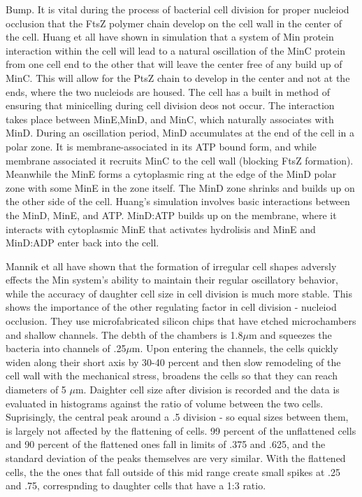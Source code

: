 \documentclass[pdftex,10pt,a4paper]{article}
\begin{document}


Bump.
It is vital during the process of bacterial cell division for proper nucleiod occlusion that the FtsZ polymer chain develop on the cell wall in the center of the cell.  Huang et all have shown in simulation that a system of Min protein interaction within the cell will lead to a natural oscillation of the MinC protein from one cell end to the other that will leave the center free of any build up of MinC.  This will allow for the PtsZ chain to develop in the center and not at the ends, where the two nucleiods are housed.  The cell has a built in method of ensuring that minicelling during cell division deos not occur.  The interaction takes place between MinE,MinD, and MinC, which naturally associates with MinD.  During an oscillation period, MinD accumulates at the end of the cell in a polar zone.  It is membrane-associated in its ATP bound form, and while membrane associated it recruits MinC to the cell wall (blocking FtsZ formation).  Meanwhile the MinE forms a cytoplasmic ring at the edge of the MinD polar zone with some MinE in the zone itself.  The MinD zone shrinks and builds up on the other side of the cell.  Huang's simulation involves basic interactions between the MinD, MinE, and ATP.  MinD:ATP builds up on the membrane, where it interacts with cytoplasmic MinE that activates hydrolisis and MinE and MinD:ADP enter back into the cell.

Mannik et all have shown that the formation of irregular cell shapes adversly effects the Min system's ability to maintain their regular oscillatory behavior, while the accuracy of daughter cell size in cell division is much more stable.  This shows the importance of the other regulating factor in cell division - nucleiod occlusion.  They use microfabricated silicon chips that have etched microchambers and shallow channels.  The debth of the chambers is 1.8$\mu$m and squeezes the bacteria into channels of .25$\mu$m.  Upon entering the channels, the cells quickly widen along their short axis by 30-40 percent and then slow remodeling of the cell wall with the mechanical stress, broadens the cells so that they can reach diameters of 5 $\mu$m.  Daighter cell size after division is recorded and the data is evaluated in histograms against the ratio of volume between the two cells.  Suprisingly, the central peak around a .5 division - so equal sizes between them, is largely not affected by the flattening of cells.  99 percent of the unflattened cells and 90 percent of the flattened ones fall in limits of .375 and .625, and the standard deviation of the peaks themselves are very similar.  With the flattened cells, the the ones that fall outside of this mid range create small spikes at .25 and .75, correspnding to daughter cells that have a 1:3 ratio.
\end{document}
